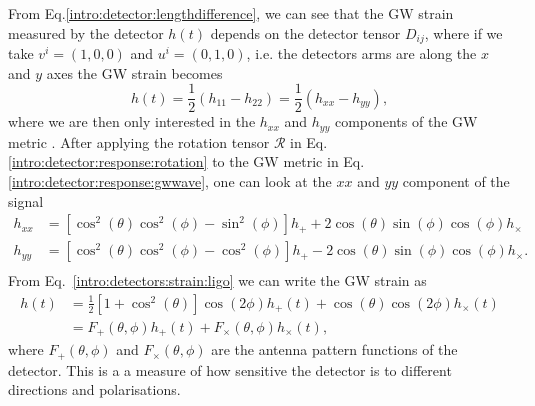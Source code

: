 From Eq.\ref{intro:detector:lengthdifference}, we can see that the \gls{GW}
strain measured by the detector $h(t)$ depends on the detector
tensor $D_{ij}$, where if we take $v^i = (1,0,0)$ and $u^i = (0,1,0)$, i.e. the detectors arms are along the $x$ and $y$ axes the \gls{GW} strain becomes 
\begin{equation}
    \label{intro:detectors:strain:ligo}
    h(t) = \frac{1}{2} \left( h_{11} - h_{22} \right) = \frac{1}{2} \left( h_{xx} - h_{yy} \right),
\end{equation}
where we are then only interested in the $h_{xx}$ and $h_{yy}$ components of the \gls{GW} metric \citep{maggioreGravitationalWaves}.
After applying the rotation tensor $\mathcal{R}$ in Eq.\ref{intro:detector:response:rotation} to the \gls{GW} metric in Eq.\ref{intro:detector:response:gwwave}, one can look at the $xx$ and $yy$ component of the signal
\begin{equation}
    \begin{split}
        h_{xx} &= \left[ \cos^2(\theta) \cos^2 (\phi) - \sin^2 (\phi)\right]h_{+} + 2\cos (\theta) \sin (\phi) \cos (\phi) h_{\times}\\
        h_{yy} &= \left[ \cos^2(\theta) \cos^2 (\phi) - \cos^2 (\phi)\right]h_{+} - 2\cos(\theta) \sin (\phi) \cos(\phi) h_{\times} . \\
    \end{split}
\end{equation}
From Eq.~\ref{intro:detectors:strain:ligo} we can write the \gls{GW} strain as
\begin{equation}
    \label{intro:detector:response:strain:polarisations}
    \begin{split}
        h(t) &= \frac{1}{2} \left[ 1 + \cos^2 \left(\theta\right) \right] \cos\left(2\phi\right) h_{+}(t) + \cos \left(\theta\right) \cos \left(2\phi \right)h_{\times}(t)\\
        &= F_{+}(\theta,\phi)h_{+}(t) + F_{\times}(\theta,\phi)h_{\times}(t),
    \end{split}
\end{equation}
where $F_{+}(\theta,\phi)$ and $F_{\times}(\theta,\phi)$ are the antenna pattern functions of the detector.
This is a a measure of how sensitive the detector is to different directions and polarisations. 


